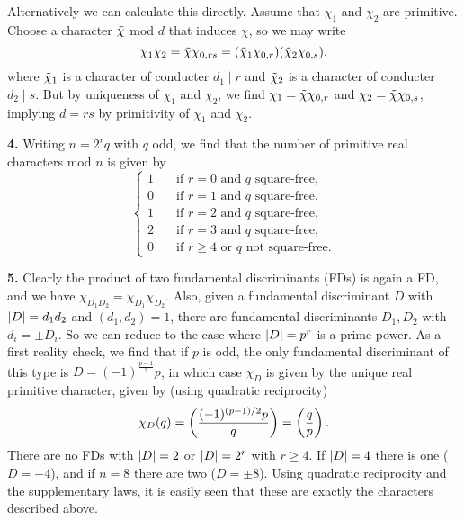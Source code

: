 \documentclass[a4paper,11pt]{article}
\begin{document}
Alternatively we can calculate this directly. Assume that $\chi_1$ and $\chi_2$
are primitive. Choose a character $\Tilde \chi$ mod $d$ that induces $\chi$, so
we may write $$\chi_1\chi_2 = \Tilde \chi \chi_{0,rs} = (\Tilde \chi_1
\chi_{0,r}) (\Tilde \chi_2 \chi_{0,s}),$$ where $\Tilde \chi_1$ is a character
of conducter $d_1 \mid r$ and $\Tilde \chi_2$ is a character of conducter $d_2
\mid s$. But by uniqueness of $\chi_1$ and $\chi_2$, we find $\chi_1 = \Tilde
\chi \chi_{0,r}$ and $\chi_2 = \Tilde \chi \chi_{0,s}$, implying $d = rs$ by
primitivity of $\chi_1$ and $\chi_2$. 

\textbf{4.} Writing $n = 2^r q$ with $q$ odd, we find that the number of primitive real
characters mod $n$ is given by 
\[
    \begin{cases}
        1 \quad &\text{if $r = 0$ and $q$ square-free}, \\
        0 \quad &\text{if $r = 1$ and $q$ square-free}, \\
        1 \quad &\text{if $r = 2$ and $q$ square-free}, \\
        2 \quad &\text{if $r = 3$ and $q$ square-free}, \\
        0 \quad &\text{if $r \geq 4$ or $q$ not square-free}. 
    \end{cases}
\]

\textbf{5.} Clearly the product of two fundamental discriminants (FDs) is again a FD,
and we have $\chi_{D_1 D_2} = \chi_{D_1}\chi_{D_2}$. Also, given a fundamental
discriminant $D$ with $\left\lvert D \right\rvert = d_1 d_2$ and $(d_1, d_2) = 1$, there are
fundamental discriminants $D_1, D_2$ with $d_i = \pm D_i$. 
So we can reduce to the case where
$\left\lvert D \right\rvert = p^r$ is a prime power. As a first reality check, we find that if $p$
is odd,
the only fundamental discriminant of this type is $D = (-1)^{\frac{p-1}2} p$,
in which case $\chi_D$ is given by the unique real primitive character, given by (using quadratic reciprocity)
$$\chi_D(q) = \left( \frac{(-1)^{(p-1)/2}p}{q} \right) = \left( \frac{q}{p} \right).$$
There are no FDs with $\left\lvert D \right\rvert =2$ or $\left\lvert D \right\rvert = 2^r$ with $r \geq 4$. If $\left\lvert D \right\rvert = 4$
there is one ($D = -4$), and if $n = 8$ there are two ($D = \pm 8$).
Using quadratic reciprocity and the supplementary laws, it is easily seen that these
are exactly the characters described above.
\end{document}
